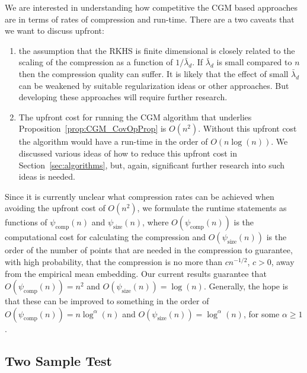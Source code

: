 \documentclass[10pt]{amsart}
\theoremstyle{definition}\newtheorem{defi}[theo]{Definition}\newtheorem{rema}[theo]{Remark}\newtheorem{exam}[theo]{Example}\newtheorem{exem}[theo]{Example}\newtheorem{nota}[theo]{Notation}
\theoremstyle{remark}
\newcommand{\compp}{\mathrm{comp}}
\newcommand{\ssize}{\mathrm{size}}
\begin{document}
We are interested in understanding how competitive the CGM based approaches are in terms of rates of compression and run-time. There are a two caveats that we want to discuss upfront: 
\begin{enumerate}
\item the assumption that the RKHS is finite dimensional is closely related to the scaling of the compression as a function of $1/\bar \lambda_d$. If $\bar \lambda_d$ is small compared to $n$ then the compression quality can suffer. It is likely that the effect of small $\bar \lambda_d$ can be weakened by suitable regularization ideas or other approaches. But developing these approaches will require further research.
\item The upfront cost for running the CGM algorithm that underlies Proposition~\ref{prop:CGM_CovOpProp} is $O(n^2)$. Without this upfront cost the algorithm would have a run-time in the order of $O(n \log(n))$. We discussed various ideas of how to reduce this upfront cost in Section~\ref{sec:algorithms}, but, again, significant further research into such ideas is needed.
\end{enumerate}

Since it is currently unclear what compression rates can be achieved when avoiding the upfront cost of $O(n^2)$, we formulate the runtime statements as functions of $\psi_{\compp}(n)$ and $\psi_{\ssize}(n)$, where $O(\psi_{\compp}(n))$ is the computational cost for calculating the compression and $O(\psi_{\ssize}(n))$ is the order of the number of points that are needed in the compression to guarantee, with high probability, that the compression is no more than $c n^{-1/2}$, $c >0$, away from the empirical mean embedding. Our current results guarantee that $O(\psi_{\compp}(n)) = n^2$ and $O(\psi_{\ssize}(n)) = \log(n)$. Generally, the hope is that these can be improved to something in the order of $O(\psi_{\compp}(n)) = n \log^\alpha(n)$ and $O(\psi_{\ssize}(n)) = \log^\alpha (n)$, for some $\alpha \geq 1$.



\subsection{Two Sample Test}
\end{document}
